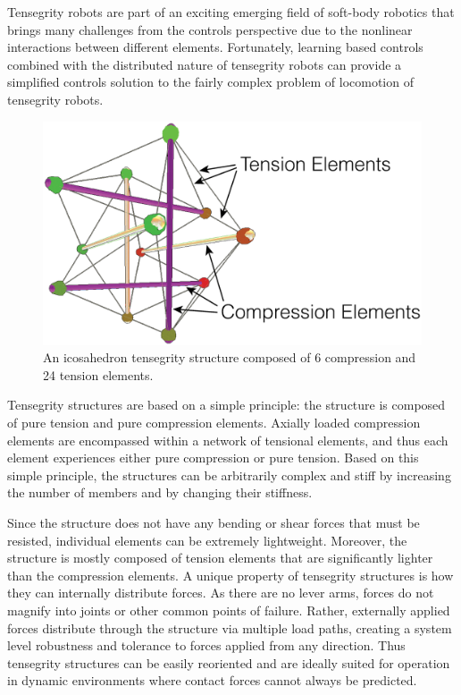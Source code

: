\documentclass[twocolumn,10pt]{asme2ej}
\begin{document}
Tensegrity robots are part of an exciting emerging field of soft-body robotics that brings many challenges from the controls perspective due to the nonlinear interactions between different elements. Fortunately, learning based controls combined with the distributed nature of tensegrity robots can provide a simplified controls solution to the fairly complex problem of locomotion of tensegrity robots.


 \begin{figure}[t]
   \centering
   \includegraphics[width=\columnwidth]{fig/tensegrity.eps} 
   \caption{An icosahedron tensegrity structure composed of 6 compression and 24 tension elements.}
   \label{fig:basic_diagram}
\end{figure}

Tensegrity structures are based on a simple principle:  the structure is composed of pure tension and pure compression elements. Axially loaded compression elements are encompassed within a network of tensional elements, and thus each element experiences either pure compression or pure tension.  Based on this simple principle, the structures can be arbitrarily complex and stiff by increasing the number of members and by changing their stiffness.



Since the structure does not have any bending or shear forces that must be resisted, individual elements can be extremely lightweight. Moreover, the structure is mostly composed of tension elements that are significantly lighter than the compression elements.  A unique property of tensegrity structures is how they can internally distribute forces.  As there are no lever arms, forces do not magnify into joints or other common points of failure.  Rather, externally applied forces distribute through the structure via multiple load paths, creating a system level robustness and tolerance to forces applied from any direction.  Thus tensegrity structures can be easily reoriented and are ideally suited for operation in dynamic environments where contact forces cannot always be predicted.
\end{document}

